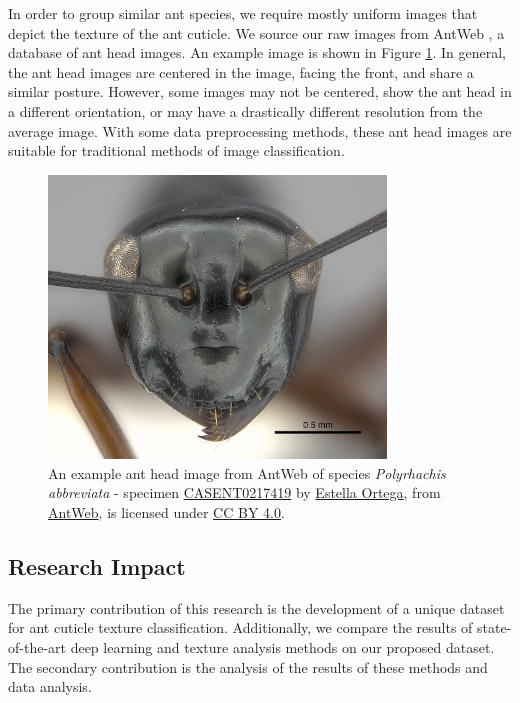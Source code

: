 \documentclass[12pt]{article}
\begin{document}
In order to group similar ant species, we require mostly uniform images that
depict the texture of the ant cuticle. We source our raw images from AntWeb
\cite{perrichot_antweb_2012}, a database of ant head images. An example image is
shown in Figure \ref{fig:CASENT0217419}. In general, the ant head images are centered in
the image, facing the front, and share a similar posture. However, some images
may not be centered, show the ant head in a different orientation, or may have a
drastically different resolution from the average image. With some data
preprocessing methods, these ant head images are suitable for traditional
methods of image classification.

\begin{figure}
    \centering
    \includegraphics[width=0.8\textwidth]{assets/images/CASENT0217419.jpg}
    \caption{ An example ant head image from AntWeb of species
        \textit{Polyrhachis abbreviata} - specimen
        \href{https://www.antweb.org/bigPicture.do?name=casent0217419&shot=h&number=1}{CASENT0217419}
        by \href{https://www.antweb.org/artist.do?id=92}{Estella Ortega}, from
        \href{https://www.antweb.org}{AntWeb}, is licensed under
        \href{https://creativecommons.org/licenses/by/4.0/}{CC BY 4.0}.}
    \label{fig:CASENT0217419}
\end{figure}

\FloatBarrier
\subsection{Research Impact}

The primary contribution of this research is the development of a unique dataset
for ant cuticle texture classification. Additionally, we compare the results of
state-of-the-art deep learning and texture analysis methods on our proposed
dataset. The secondary contribution is the analysis of the results of these
methods and data analysis.
\newpage
\end{document}
